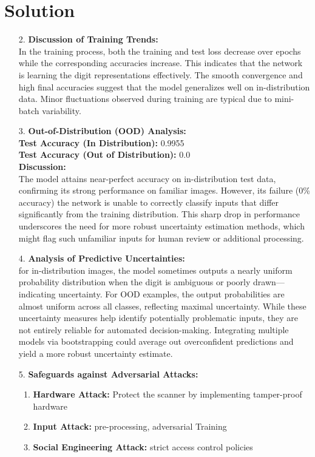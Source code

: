 \documentclass[submit]{../harvardml}
\newenvironment{answer}
  {\section*{Solution}}
{}
\begin{document}
\begin{answer}
\begin{enumerate}
    \item[2.]
      \textbf{Discussion of Training Trends:} \\
      In the training process, both the training and test loss decrease over epochs while the corresponding accuracies increase. This indicates that the network is learning the digit representations effectively. The smooth convergence and high final accuracies suggest that the model generalizes well on in-distribution data. Minor fluctuations observed during training are typical due to mini-batch variability.

    \item[3.]
      \textbf{Out-of-Distribution (OOD) Analysis:} \\
      \textbf{Test Accuracy (In Distribution):} 0.9955 \\
      \textbf{Test Accuracy (Out of Distribution):} 0.0 \\[0.5em]
      \textbf{Discussion:} \\
      The model attains near-perfect accuracy on in-distribution test data, confirming its strong performance on familiar images. However, its failure (0\% accuracy) the network is unable to correctly classify inputs that differ significantly from the training distribution. This sharp drop in performance underscores the need for more robust uncertainty estimation methods, which might flag such unfamiliar inputs for human review or additional processing.

    \item[4.]
      \textbf{Analysis of Predictive Uncertainties:} \\
       for in-distribution images, the model sometimes outputs a nearly uniform probability distribution when the digit is ambiguous or poorly drawn—indicating uncertainty. For OOD examples, the output probabilities are almost uniform across all classes, reflecting maximal uncertainty. While these uncertainty measures help identify potentially problematic inputs, they are not entirely reliable for automated decision-making. Integrating multiple models via bootstrapping could average out overconfident predictions and yield a more robust uncertainty estimate.

    \item[5.]
      \textbf{Safeguards against Adversarial Attacks:} \\
      \begin{enumerate}
        \item \textbf{Hardware Attack:} Protect the scanner by implementing tamper-proof hardware 
        \item \textbf{Input Attack:}  pre-processing, adversarial Training
        \item \textbf{Social Engineering Attack:} strict access control policies
      \end{enumerate}
  \end{enumerate}

\end{answer}
\end{document}
